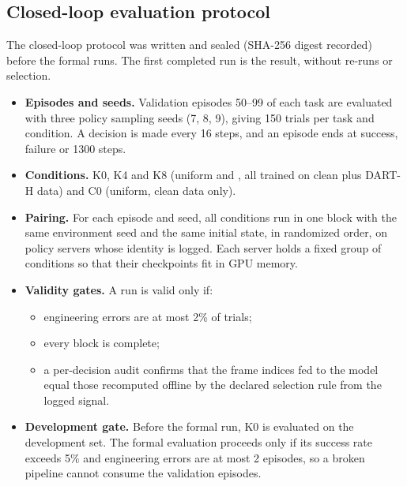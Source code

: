 \subsection{Closed-loop evaluation protocol}
\label{sec:protocol}
The closed-loop protocol was written and sealed (SHA-256 digest recorded) before the formal runs. The first completed run is the result, without re-runs or selection.
\begin{itemize}
\item \textbf{Episodes and seeds.} Validation episodes 50--99 of each task are evaluated with three policy sampling seeds (7, 8, 9), giving 150 trials per task and condition. A decision is made every 16 steps, and an episode ends at success, failure or 1300 steps.
\item \textbf{Conditions.} K0, K4 and K8 (uniform and \pekm, all trained on clean plus DART-H data) and C0 (uniform, clean data only).
\item \textbf{Pairing.} For each episode and seed, all conditions run in one block with the same environment seed and the same initial state, in randomized order, on policy servers whose identity is logged. Each server holds a fixed group of conditions so that their checkpoints fit in GPU memory.
\item \textbf{Validity gates.} A run is valid only if:
  \begin{itemize}
  \item engineering errors are at most 2\% of trials;
  \item every block is complete;
  \item a per-decision audit confirms that the frame indices fed to the model equal those recomputed offline by the declared selection rule from the logged signal.
  \end{itemize}
\item \textbf{Development gate.} Before the formal run, K0 is evaluated on the development set. The formal evaluation proceeds only if its success rate exceeds 5\% and engineering errors are at most 2 episodes, so a broken pipeline cannot consume the validation episodes.
\end{itemize}


